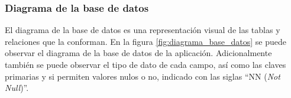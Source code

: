 


\subsubsection{Diagrama de la base de datos}

El diagrama de la base de datos es una representación visual de las tablas y relaciones que la conforman. En la figura \ref{fig:diagrama_base_datos} se puede observar el diagrama de la base de datos de la aplicación. Adicionalmente también se puede observar el tipo de dato de cada campo, así como las claves primarias y si permiten valores nulos o no, indicado con las siglas ``NN (\textit{Not Null})''.

